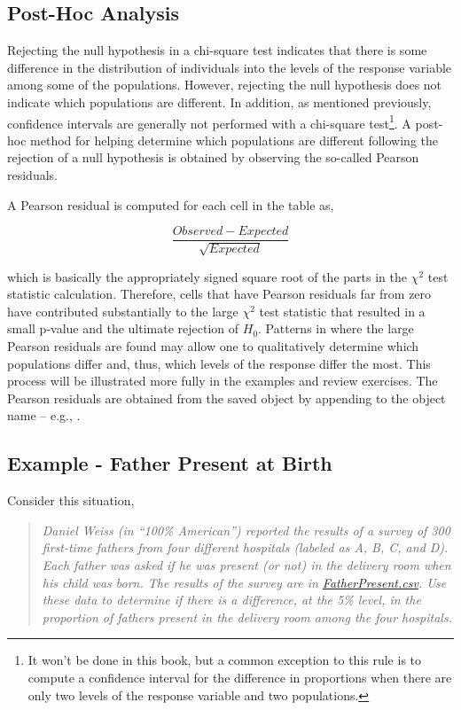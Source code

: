 \documentclass[10pt,openany]{book}\usepackage[]{graphicx}\usepackage[]{color}
\begin{document}
\subsection{Post-Hoc Analysis}
Rejecting the null hypothesis in a chi-square test indicates that there is some difference in the distribution of individuals into the levels of the response variable among some of the populations.  However, rejecting the null hypothesis does not indicate which populations are different.  In addition, as mentioned previously, confidence intervals are generally not performed with a chi-square test\footnote{It won't be done in this book, but a common exception to this rule is to compute a confidence interval for the difference in proportions when there are only two levels of the response variable and two populations.}.  A post-hoc method for helping determine which populations are different following the rejection of a null hypothesis is obtained by observing the so-called Pearson residuals.

A Pearson residual is computed for each cell in the table as,

\[ \frac{Observed-Expected}{\sqrt{Expected}} \]

which is basically the appropriately signed square root of the parts in the $\chi^2$ test statistic calculation.  Therefore, cells that have Pearson residuals far from zero have contributed substantially to the large $\chi^2$ test statistic that resulted in a small p-value and the ultimate rejection of $H_{0}$.  Patterns in where the large Pearson residuals are found may allow one to qualitatively determine which populations differ and, thus, which levels of the response differ the most.  This process will be illustrated more fully in the examples and review exercises.  The Pearson residuals are obtained from the saved  object by appending  to the object name -- e.g., .

\subsection{Example - Father Present at Birth}
Consider this situation,
\begin{quote}
\textsl{Daniel Weiss (in ``100\% American'') reported the results of a survey of 300 first-time fathers from four different hospitals (labeled as A, B, C, and D).  Each father was asked if he was present (or not) in the delivery room when his child was born.  The results of the survey are in \href{https://raw.githubusercontent.com/droglenc/NCData/master/FatherPresent.csv}{FatherPresent.csv}.  Use these data to determine if there is a difference, at the 5\% level, in the proportion of fathers present in the delivery room among the four hospitals.}
\end{quote}
\end{document}
